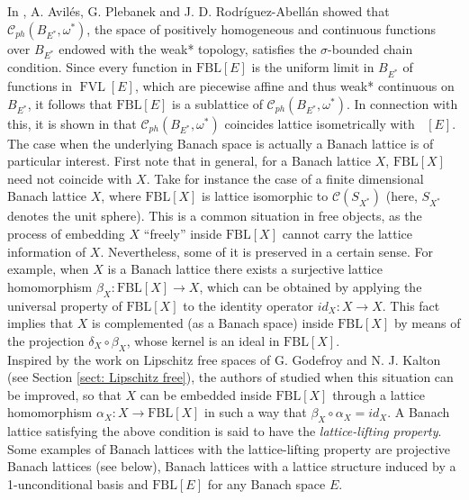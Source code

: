 \documentclass[12pt,leqno]{amsart}
\numberwithin{equation}{section} %
\newtheorem{thm}{Theorem}[section]
\theoremstyle{definition}
\numberwithin{equation}{section}
\newcommand{\Ccal}{\mathcal{C}}
\newcommand{\fbl}{\mathrm{FBL}}
\DeclareMathOperator{\FVL}{FVL}
\DeclareMathOperator{\FBLi}{FBL^{(\infty)}}
\begin{document}
In \cite{APR}, A. Avil\'es, G. Plebanek and J. D. Rodr\'iguez-Abell\'an showed that $\Ccal_{ph}(B_{E^*},\omega^*)$, the space of positively homogeneous and continuous functions over $B_{E^*}$ endowed with the weak* topology, satisfies the $\sigma$-bounded chain condition. Since every function in $\fbl[E]$ is the uniform limit in $B_{E^*}$ of functions in $\FVL[E]$, which are piecewise affine and thus weak* continuous on $B_{E^*}$, it follows that $\fbl[E]$ is a sublattice of $\Ccal_{ph}(B_{E^*},\omega^*)$. In connection with this, it is shown in \cite[Proposition 2.2]{OTTT} that $\Ccal_{ph}(B_{E^*},\omega^*)$ coincides lattice isometrically with $\FBLi[E]$. \\%


The case when the underlying Banach space is actually a Banach lattice is of particular interest. First note that in general, for a Banach lattice $X$, $\fbl[X]$ need not coincide with $X$. Take for instance the case of a finite dimensional Banach lattice $X$, where $\fbl[X]$ is lattice isomorphic to $\Ccal(S_{X^*})$ (here, $S_{X^*}$ denotes the unit sphere). This is a common situation in free objects, as the process of embedding $X$ ``freely'' inside $\fbl[X]$ cannot carry the lattice information of $X$. Nevertheless, some of it is preserved in a certain sense. For example, when $X$ is a Banach lattice there exists a surjective lattice homomorphism $\beta_X:\fbl[X]\rightarrow X$, which can be obtained by applying the universal property of $\fbl[X]$ to the identity operator $id_X:X\rightarrow X$. This fact implies that $X$ is complemented (as a Banach space) inside $\fbl[X]$ by means of the projection $\delta_X\circ \beta_X$, whose kernel is an ideal in $\fbl[X]$.\\ 

Inspired by the work on Lipschitz free spaces of G. Godefroy and N. J. Kalton \cite{GK} (see Section \ref{sect: Lipschitz free}), the authors of \cite{AMRT} studied when this situation can be improved, so that $X$ can be embedded inside $\fbl[X]$ through a lattice homomorphism $\alpha_X:X\rightarrow \fbl[X]$ in such a way that $\beta_X\circ \alpha_X=id_X$. A Banach lattice satisfying the above condition is said to have the \textit{lattice-lifting property}. Some examples of Banach lattices with the lattice-lifting property are projective Banach lattices (see  below), Banach lattices with a lattice structure induced by a 1-unconditional basis and $\fbl[E]$ for any Banach space $E$.\\
\end{document}
